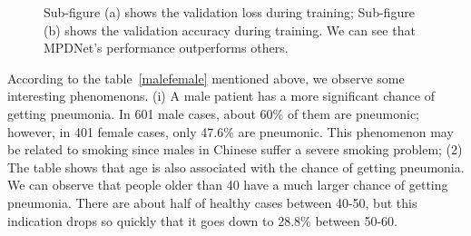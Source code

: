 \documentclass[journal]{IEEEtran}
\begin{document}
\begin{figure}[htbp]
    \centering
    \centering
    \caption{Sub-figure (a) shows the validation loss during training; Sub-figure (b) shows the validation accuracy during training. We can see that MPDNet's performance outperforms others.
    }
    \label{loss}

    \end{figure}

According to the table~\ref{malefemale} mentioned above, we observe some interesting phenomenons. (i) A male patient has a more significant chance of getting pneumonia. In 601 male cases, about 60\% of them are pneumonic; however, in 401 female cases, only 47.6\% are pneumonic. This phenomenon may be related to smoking since males in Chinese suffer a severe smoking problem; (2) The table shows that age is also associated with the chance of getting pneumonia. We can observe that people older than 40 have a much larger chance of getting pneumonia. There are about half of healthy cases between 40-50, but this indication drops so quickly that it goes down to 28.8\% between 50-60. 
\end{document}
